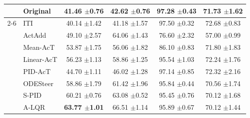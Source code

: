 \documentclass{article}
\theoremstyle{plain}
\theoremstyle{definition}
\theoremstyle{remark}
\begin{document}
\begin{table}[H]
\begin{threeparttable}
\begin{tabular}{ll|>{\columncolor{lightblue}}ccc|c}
    \midrule
    & Original &  41.46 {\tiny $\pm$0.76} & 42.62 {\tiny $\pm$0.76} & 97.28 {\tiny $\pm$0.43} & 71.73 {\tiny $\pm$1.62} \\
    \cmidrule(lr){2-6}
    \multirow{7}{*}{\rotatebox{90}{Gemma-2-9B}} 
    & ITI & 40.14 {\tiny $\pm$1.42} & 41.18 {\tiny $\pm$1.57} & 97.50 {\tiny $\pm$0.32} & 72.68 {\tiny $\pm$0.83} \\
    & ActAdd & 49.10 {\tiny $\pm$2.57} & 64.06 {\tiny $\pm$1.43} & 76.60 {\tiny $\pm$2.32} & 57.00 {\tiny $\pm$0.99} \\
    & Mean-AcT & 53.87 {\tiny $\pm$1.75} & 56.06 {\tiny $\pm$1.82} & 86.10 {\tiny $\pm$0.83} & 71.80 {\tiny $\pm$1.83} \\
    & Linear-AcT & 56.23 {\tiny $\pm$1.13} & 58.86 {\tiny $\pm$1.25} & 95.54 {\tiny $\pm$1.03} & 72.24 {\tiny $\pm$1.76} \\
    & PID-AcT & 44.70 {\tiny $\pm$1.11} & 46.02 {\tiny $\pm$1.28} & 97.14 {\tiny $\pm$0.85} & 72.32 {\tiny $\pm$2.16}\\
    & ODESteer & 58.86 {\tiny $\pm$1.79} & 61.42 {\tiny $\pm$1.96} & 95.84 {\tiny $\pm$0.44} & 70.56 {\tiny $\pm$1.74} \\
    & S-PID &  60.21 {\tiny $\pm$0.76} & 63.08 {\tiny $\pm$0.52} & 95.45 {\tiny $\pm$0.76} & 70.12 {\tiny $\pm$1.68} \\
    & A-LQR &  \textbf{63.77 {\tiny $\pm$1.01}} & 66.51 {\tiny $\pm$1.14} & 95.89 {\tiny $\pm$0.67} & 70.12 {\tiny $\pm$1.44} \\


\end{tabular}
\end{threeparttable}
\end{table}
\end{document}
